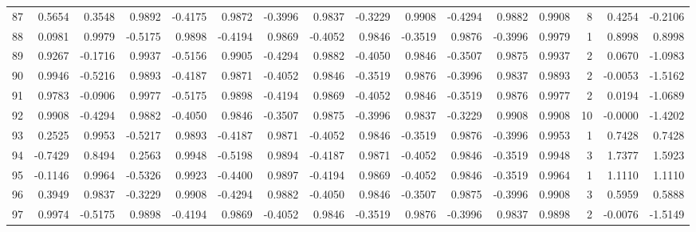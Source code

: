 \begin{tabular}{lrrrrrrrrrrrrrrr}
87  &      0.5654 &  0.3548 &  0.9892 & -0.4175 &  0.9872 & -0.3996 &  0.9837 & -0.3229 &  0.9908 & -0.4294 &   0.9882 &     0.9908 &      8 &                    0.4254 &                    -0.2106 \\
88  &      0.0981 &  0.9979 & -0.5175 &  0.9898 & -0.4194 &  0.9869 & -0.4052 &  0.9846 & -0.3519 &  0.9876 &  -0.3996 &     0.9979 &      1 &                    0.8998 &                     0.8998 \\
89  &      0.9267 & -0.1716 &  0.9937 & -0.5156 &  0.9905 & -0.4294 &  0.9882 & -0.4050 &  0.9846 & -0.3507 &   0.9875 &     0.9937 &      2 &                    0.0670 &                    -1.0983 \\
90  &      0.9946 & -0.5216 &  0.9893 & -0.4187 &  0.9871 & -0.4052 &  0.9846 & -0.3519 &  0.9876 & -0.3996 &   0.9837 &     0.9893 &      2 &                   -0.0053 &                    -1.5162 \\
91  &      0.9783 & -0.0906 &  0.9977 & -0.5175 &  0.9898 & -0.4194 &  0.9869 & -0.4052 &  0.9846 & -0.3519 &   0.9876 &     0.9977 &      2 &                    0.0194 &                    -1.0689 \\
92  &      0.9908 & -0.4294 &  0.9882 & -0.4050 &  0.9846 & -0.3507 &  0.9875 & -0.3996 &  0.9837 & -0.3229 &   0.9908 &     0.9908 &     10 &                   -0.0000 &                    -1.4202 \\
93  &      0.2525 &  0.9953 & -0.5217 &  0.9893 & -0.4187 &  0.9871 & -0.4052 &  0.9846 & -0.3519 &  0.9876 &  -0.3996 &     0.9953 &      1 &                    0.7428 &                     0.7428 \\
94  &     -0.7429 &  0.8494 &  0.2563 &  0.9948 & -0.5198 &  0.9894 & -0.4187 &  0.9871 & -0.4052 &  0.9846 &  -0.3519 &     0.9948 &      3 &                    1.7377 &                     1.5923 \\
95  &     -0.1146 &  0.9964 & -0.5326 &  0.9923 & -0.4400 &  0.9897 & -0.4194 &  0.9869 & -0.4052 &  0.9846 &  -0.3519 &     0.9964 &      1 &                    1.1110 &                     1.1110 \\
96  &      0.3949 &  0.9837 & -0.3229 &  0.9908 & -0.4294 &  0.9882 & -0.4050 &  0.9846 & -0.3507 &  0.9875 &  -0.3996 &     0.9908 &      3 &                    0.5959 &                     0.5888 \\
97  &      0.9974 & -0.5175 &  0.9898 & -0.4194 &  0.9869 & -0.4052 &  0.9846 & -0.3519 &  0.9876 & -0.3996 &   0.9837 &     0.9898 &      2 &                   -0.0076 &                    -1.5149 \\

\end{tabular}
